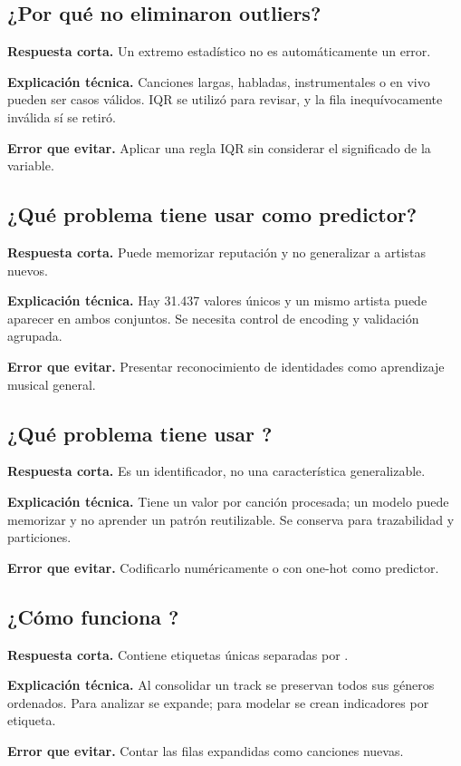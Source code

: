 \subsection*{¿Por qué no eliminaron outliers?}
\textbf{Respuesta corta.} Un extremo estadístico no es automáticamente un error.\par
\textbf{Explicación técnica.} Canciones largas, habladas, instrumentales o en vivo pueden ser casos
válidos. IQR se utilizó para revisar, y la fila inequívocamente inválida sí se retiró.\par
\textbf{Error que evitar.} Aplicar una regla IQR sin considerar el significado de la variable.

\subsection*{¿Qué problema tiene usar  como predictor?}
\textbf{Respuesta corta.} Puede memorizar reputación y no generalizar a artistas nuevos.\par
\textbf{Explicación técnica.} Hay 31.437 valores únicos y un mismo artista puede aparecer en ambos
conjuntos. Se necesita control de encoding y validación agrupada.\par
\textbf{Error que evitar.} Presentar reconocimiento de identidades como aprendizaje musical general.

\subsection*{¿Qué problema tiene usar ?}
\textbf{Respuesta corta.} Es un identificador, no una característica generalizable.\par
\textbf{Explicación técnica.} Tiene un valor por canción procesada; un modelo puede memorizar y no
aprender un patrón reutilizable. Se conserva para trazabilidad y particiones.\par
\textbf{Error que evitar.} Codificarlo numéricamente o con one-hot como predictor.

\subsection*{¿Cómo funciona ?}
\textbf{Respuesta corta.} Contiene etiquetas únicas separadas por \code{|}.\par
\textbf{Explicación técnica.} Al consolidar un track se preservan todos sus géneros ordenados. Para
analizar se expande; para modelar se crean indicadores por etiqueta.\par
\textbf{Error que evitar.} Contar las filas expandidas como canciones nuevas.

